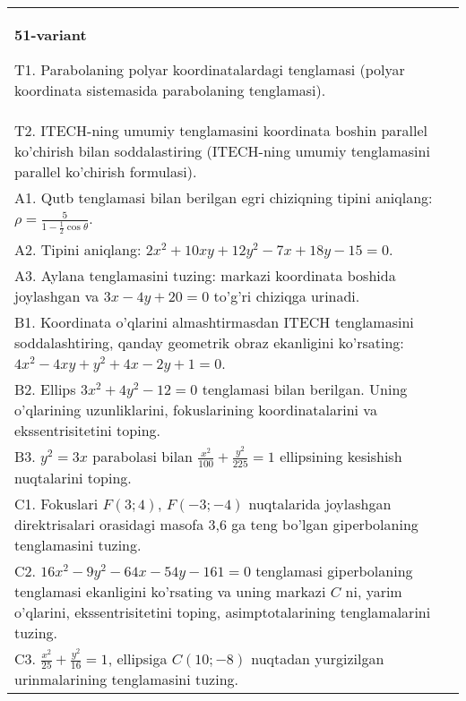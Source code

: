 \documentclass{article}
\begin{document}
\begin{tabular}{m{17cm}}
\textbf{51-variant}
\newline

T1. Parabolaning polyar koordinatalardagi tenglamasi (polyar koordinata sistemasida parabolaning tenglamasi).\\

T2. ITECH-ning umumiy tenglamasini koordinata boshin parallel ko'chirish bilan soddalastiring (ITECH-ning umumiy tenglamasini parallel ko'chirish formulasi).\\

A1. Qutb tenglamasi bilan berilgan egri chiziqning tipini aniqlang: $\rho=\frac{5}{1-\frac{1}{2}\cos\theta}$.\\

A2. Tipini aniqlang: $2x^{2}+10xy+12y^{2}-7x+18y-15=0$.\\

A3. Aylana tenglamasini tuzing: markazi koordinata boshida joylashgan va $3x-4y+20=0$ to'g'ri chiziqga urinadi.\\

B1. Koordinata o'qlarini almashtirmasdan ITECH tenglamasini soddalashtiring, qanday geometrik obraz ekanligini ko'rsating: $4x^{2} - 4xy + y^{2} + 4x - 2y + 1 = 0$.  \\

B2. Ellips $3x^{2} + 4y^{2} - 12 = 0$ tenglamasi bilan berilgan. Uning o'qlarining uzunliklarini, fokuslarining koordinatalarini va ekssentrisitetini toping.  \\

B3. $y^{2} = 3x$ parabolasi bilan $\frac{x^{2}}{100} + \frac{y^{2}}{225} = 1$ ellipsining kesishish nuqtalarini toping.  \\

C1. Fokuslari $F(3;4)$, $F(-3;-4)$ nuqtalarida joylashgan direktrisalari orasidagi masofa 3,6 ga teng bo'lgan giperbolaning tenglamasini tuzing.  \\

C2. $16x^{2} - 9y^{2} - 64x - 54y - 161 = 0$ tenglamasi giperbolaning tenglamasi ekanligini ko'rsating va uning markazi $C$ ni, yarim o'qlarini, ekssentrisitetini toping, asimptotalarining tenglamalarini tuzing.  \\

C3. $\frac{x^{2}}{25} + \frac{y^{2}}{16} = 1$, ellipsiga $C(10; - 8)$ nuqtadan yurgizilgan urinmalarining tenglamasini tuzing.  \\

\end{tabular}
\vspace{1cm}
\end{document}
